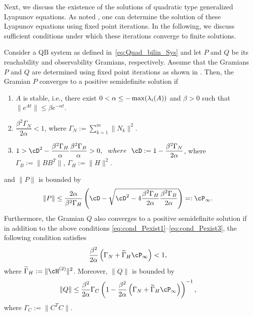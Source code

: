  Next, we discuss the existence of the solutions of quadratic type generalized Lyapunov equations. As noted , one can determine the solution of these Lyapunov equations using  fixed point iterations. In the following, we discuss sufficient conditions under which these iterations converge to finite solutions.    
\begin{theorem}
Consider a QB system as defined in~\cref{eq:Quad_bilin_Sys} and let $P$ and $Q$ be its reachability and observability Gramians, respectively.	Assume that the Gramians $P$ and $Q$ are determined using fixed point iterations as shown in .   Then, the Gramian $P$ converges to a positive semidefinite solution if
	\begin{enumerate}[label=(\roman*)]
	\item $A$ is stable, i.e., there exist  $0<\alpha\leq -\max(\real{\lambda_i (A)})$ and $\beta>0$  such that $\|e^{At}\| \leq \beta e^{-\alpha t}$. \label{eq:cond_Pexist1}
	\item $\dfrac{	\beta^2\Gamma_N }{2\alpha} < 1$, where $\Gamma_N := \sum_{k=1}^m\|N_k\|^2$.
	\item $ 1>\cD^2 - \dfrac{\beta^2 \Gamma_H}{\alpha}\dfrac{\beta^2\Gamma_B}{\alpha} > 0, ~~where~~ \cD:= 1-\dfrac{\beta^2\Gamma_N}{2\alpha}$,\label{eq:cond_Pexist3}
	where $\Gamma_B := \|BB^T\|$, $\Gamma_H := \|H\|^2$.
   \end{enumerate}
   and $\|P\|$ is bounded by
	\begin{equation}
	\|P\| \leq \dfrac{2\alpha}{\beta^2\Gamma_H} \left(\cD- \sqrt{\cD^2 - 4\dfrac{\beta^2 \Gamma_H}{2\alpha}\dfrac{\beta^2\Gamma_B}{2\alpha} }\right) =: \cP_\infty.
	\end{equation}
	Furthermore, the Gramian $Q$  also converges to a positive semidefinite solution if in addition to the above  conditions \ref{eq:cond_Pexist1}--\ref{eq:cond_Pexist3}, the following condition satisfies
	 		\begin{equation}
	 		\dfrac{\beta^2}{2\alpha}	\left(\Gamma_N + \tilde\Gamma_{H} \cP_\infty \right)< 1,
	 		\end{equation}
	 		where $\tilde{\Gamma}_H := \|\cH^{(2)}\|^2$. Moreover,  $\|Q\|$ is bounded by 
	 		\begin{equation}
		\|Q\| \leq \dfrac{\beta^2}{2\alpha}\Gamma_C \left(1-\dfrac{\beta^2}{2\alpha}	\left(\Gamma_N + \tilde\Gamma_H \cP_\infty \right)\right)^{-1},
	 		\end{equation}
	 		where $\Gamma_C:= \|C^TC\|.$
\end{theorem}
